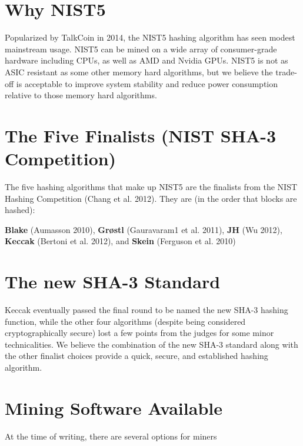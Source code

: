 \documentclass[11pt,a4paperpaper,]{report}
\begin{document}
\section{Why NIST5}\label{why-nist5}

Popularized by TalkCoin in 2014, the NIST5 hashing algorithm has seen
modest mainstream usage. NIST5 can be mined on a wide array of
consumer-grade hardware including CPUs, as well as AMD and Nvidia GPUs.
NIST5 is not as ASIC resistant as some other memory hard algorithms, but
we believe the trade-off is acceptable to improve system stability and
reduce power consumption relative to those memory hard algorithms.

\section{The Five Finalists (NIST SHA-3
Competition)}\label{the-five-finalists-nist-sha-3-competition}

The five hashing algorithms that make up NIST5 are the finalists from
the NIST Hashing Competition (Chang et al. 2012). They are (in the order
that blocks are hashed):

\textbf{Blake} (Aumasson 2010), \textbf{Grøstl} (Gauravaram1 et al.
2011), \textbf{JH} (Wu 2012), \textbf{Keccak} (Bertoni et al. 2012), and
\textbf{Skein} (Ferguson et al. 2010)

\section{The new SHA-3 Standard}\label{the-new-sha-3-standard}

Keccak eventually passed the final round to be named the new SHA-3
hashing function, while the other four algorithms (despite being
considered cryptographically secure) lost a few points from the judges
for some minor technicalities. We believe the combination of the new
SHA-3 standard along with the other finalist choices provide a quick,
secure, and established hashing algorithm.

\section{Mining Software Available}\label{mining-software-available}

At the time of writing, there are several options for miners
\end{document}
